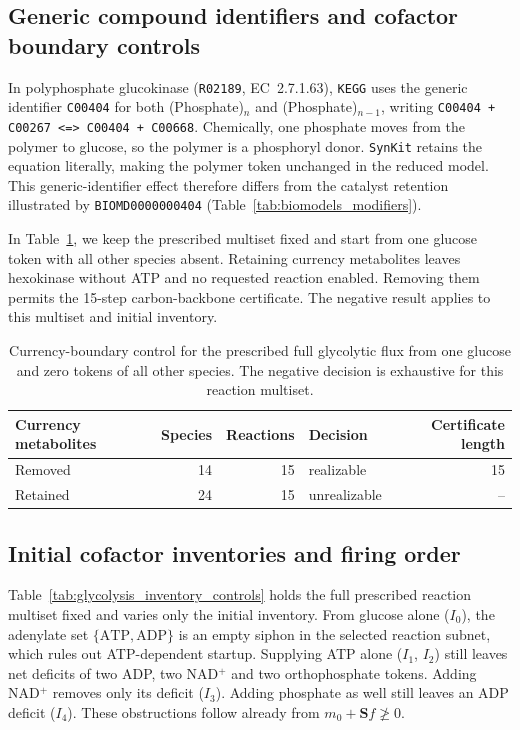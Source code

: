 \documentclass[10pt,a4paper,fleqn]{article}
\theoremstyle{plain}\newtheorem{theorem}{Theorem}
\newcommand{\synkit}{\texttt{SynKit}\xspace}
\begin{document}
\subsection{\texorpdfstring{Generic compound identifiers}{Generic compound identifiers} and cofactor boundary controls}

In polyphosphate glucokinase (\texttt{R02189}, EC~2.7.1.63), \texttt{KEGG} uses the generic identifier \texttt{C00404} for both (Phosphate)$_n$ and (Phosphate)$_{n-1}$, writing \texttt{C00404 + C00267 <=> C00404 + C00668}. Chemically, one phosphate moves from the polymer to glucose, so the polymer is a phosphoryl donor. \synkit retains the equation literally, making the polymer token unchanged in the reduced model. This generic-identifier effect therefore differs from the catalyst retention illustrated by \texttt{BIOMD0000000404} (Table~\ref{tab:biomodels_modifiers}).

In Table~\ref{tab:glycolysis_currency}, we keep the prescribed multiset fixed and start from one glucose token with all other species absent. Retaining currency metabolites leaves hexokinase without ATP and no requested reaction enabled. Removing them permits the 15-step carbon-backbone certificate. The negative result applies to this multiset and initial inventory.

\begin{table}[htbp]
\centering
\caption{Currency-boundary control for the prescribed full glycolytic flux from one glucose and zero tokens of all other species. The negative decision is exhaustive for this reaction multiset.}
\label{tab:glycolysis_currency}
\begin{tabular*}{\linewidth}{@{\extracolsep{\fill}}lrrlr@{}}
\toprule
Currency metabolites & Species & Reactions & Decision & Certificate length \\
\midrule
Removed & 14 & 15 & realizable & 15 \\
Retained & 24 & 15 & unrealizable & -- \\
\bottomrule
\end{tabular*}
\end{table}

\subsection{Initial cofactor inventories and firing order}

Table~\ref{tab:glycolysis_inventory_controls} holds the full prescribed reaction multiset fixed and varies only the initial inventory. From glucose alone ($I_0$), the adenylate set $\{\mathrm{ATP},\mathrm{ADP}\}$ is an empty siphon in the selected reaction subnet, which rules out ATP-dependent startup. Supplying ATP alone ($I_1$, $I_2$) still leaves net deficits of two ADP, two NAD$^+$ and two orthophosphate tokens. Adding NAD$^+$ removes only its deficit ($I_3$). Adding phosphate as well still leaves an ADP deficit ($I_4$). These obstructions follow already from $m_0+\mathbf Sf\not\ge0$.
\end{document}
